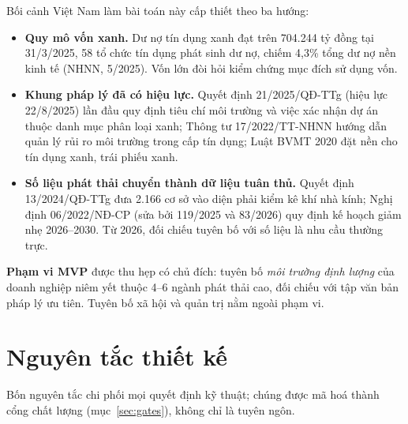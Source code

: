 \documentclass[11pt,a4paper]{article}
\begin{document}
Bối cảnh Việt Nam làm bài toán này cấp thiết theo ba hướng:
\begin{itemize}
  \item \textbf{Quy mô vốn xanh.} Dư nợ tín dụng xanh đạt trên 704.244 tỷ đồng tại 31/3/2025, 58 tổ chức tín dụng phát sinh dư nợ, chiếm 4,3\% tổng dư nợ nền kinh tế (NHNN, 5/2025). Vốn lớn đòi hỏi kiểm chứng mục đích sử dụng vốn.
  \item \textbf{Khung pháp lý đã có hiệu lực.} Quyết định 21/2025/QĐ-TTg (hiệu lực 22/8/2025) lần đầu quy định tiêu chí môi trường và việc xác nhận dự án thuộc danh mục phân loại xanh; Thông tư 17/2022/TT-NHNN hướng dẫn quản lý rủi ro môi trường trong cấp tín dụng; Luật BVMT 2020 đặt nền cho tín dụng xanh, trái phiếu xanh.
  \item \textbf{Số liệu phát thải chuyển thành dữ liệu tuân thủ.} Quyết định 13/2024/QĐ-TTg đưa 2.166 cơ sở vào diện phải kiểm kê khí nhà kính; Nghị định 06/2022/NĐ-CP (sửa bởi 119/2025 và 83/2026) quy định kế hoạch giảm nhẹ 2026--2030. Từ 2026, đối chiếu tuyên bố với số liệu là nhu cầu thường trực.
\end{itemize}

\textbf{Phạm vi MVP} được thu hẹp có chủ đích: tuyên bố \emph{môi trường định lượng} của doanh nghiệp niêm yết thuộc 4--6 ngành phát thải cao, đối chiếu với tập văn bản pháp lý ưu tiên. Tuyên bố xã hội và quản trị nằm ngoài phạm vi.

\section{Nguyên tắc thiết kế}

Bốn nguyên tắc chi phối mọi quyết định kỹ thuật; chúng được mã hoá thành cổng chất lượng (mục~\ref{sec:gates}), không chỉ là tuyên ngôn.
\end{document}
